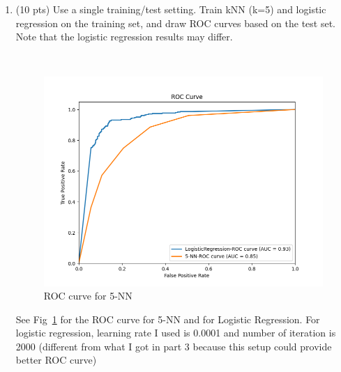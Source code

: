 \documentclass[a4paper]{article}
\theoremstyle{definition}
\newenvironment{soln}{
    \leavevmode\color{blue}\ignorespaces
}{}
\begin{document}
\begin{enumerate}
	
	\item (10 pts) Use a single training/test setting. Train kNN (k=5) and logistic regression on the training set, and draw ROC curves based on the test set. \\
	Note that the logistic regression results may differ.
	
	\begin{soln}\\
	\begin{figure}
		\centering
		\includegraphics[width=0.5\linewidth]{images/ROC_Q2_5.png}
		\caption{ROC curve for 5-NN}
		\label{fig:rocq25}
	\end{figure}
	See Fig~\ref{fig:rocq25} for the ROC curve for 5-NN and for Logistic Regression. For logistic regression, learning rate I used is 0.0001 and number of iteration is 2000 (different from what I got in part 3 because this setup could provide better ROC curve)\\
	\end{soln}
	
\end{enumerate}

\end{document}
